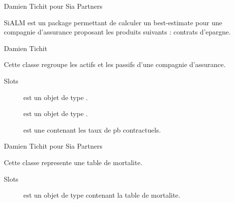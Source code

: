\documentclass[a4paper]{book}
\begin{document}
%
\begin{Author}\relax
Damien Tichit pour Sia Partners
\end{Author}
%
\begin{Description}\relax
SiALM est un package permettant de calculer un best-estimate pour une compagnie d'assurance
proposant les produits suivants : contrats d'epargne.
\end{Description}
%
\begin{Author}\relax
Damien Tichit
\end{Author}
%
\begin{Description}\relax
Cette classe regroupe les actifs et les passifs d'une compagnie d'assurance.
\end{Description}
%
\begin{Section}{Slots}

\begin{description}

\item[] est un objet de type .

\item[] est un objet de type .

\item[] est une  contenant les taux de pb contractuels.

\end{description}
\end{Section}
%
\begin{Author}\relax
Damien Tichit pour Sia Partners
\end{Author}
%
\begin{Description}\relax
Cette classe represente une table de mortalite.
\end{Description}
%
\begin{Section}{Slots}

\begin{description}

\item[] est un objet de type  contenant la table de mortalite.

\end{description}
\end{Section}
\end{document}
